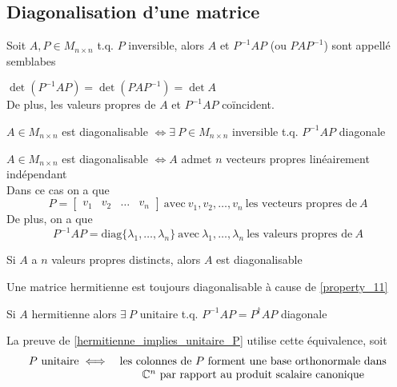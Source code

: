 \subsection{Diagonalisation d'une matrice}
\begin{definition}
    Soit $A, P \in M_{n \times n}$ t.q. $P$ inversible, alors $A$ et $P^{-1}AP$ (ou $PAP^{-1}$) sont appellé semblabes
\end{definition}
\begin{remark}
    $\det(P^{-1}AP) = \det(PAP^{-1}) = \det A$ \\
    De plus, les valeurs propres de $A$ et $P^{-1}AP$ coïncident.
\end{remark}
\begin{definition}
    $A \in M_{n \times n}$ est diagonalisable $\iff \exists \ P \in M_{n \times n}$ inversible t.q. $P^{-1}AP$ diagonale
\end{definition}
\begin{theorem}
    $A \in M_{n \times n}$ est diagonalisable $\iff A$ admet $n$ vecteurs propres linéairement indépendant \\
    Dans ce cas on a que \[P = \begin{bmatrix}
            v_1 & v_2 & \dots & v_n
        \end{bmatrix} \ \text{avec} \ v_1, v_2, \dots, v_n \ \text{les vecteurs propres de} \ A\] 
        De plus, on a que
        \[P^{-1}AP = \text{diag}\{\lambda_1, \dots, \lambda_n\} \ \text{avec} \ \lambda_1, \dots, \lambda_n 
        \ \text{les valeurs propres de} \ A\] 
\end{theorem}
\begin{corollary}
    Si $A$ a $n$ valeurs propres distincts, alors $A$ est diagonalisable
\end{corollary}
\begin{corollary}
    Une matrice hermitienne est toujours diagonalisable à cause de \ref{property_11}
\end{corollary}
\begin{corollary}
    \label{hermitienne_implies_unitaire_P}
    Si $A$ hermitienne alors $\exists \ P$ unitaire t.q. $P^{-1}AP = P^\dagger A P$ diagonale
\end{corollary}
\begin{remark}
    La preuve de \ref{hermitienne_implies_unitaire_P} utilise cette équivalence, soit
    \[
        \begin{matrix}
            P \ \text{unitaire} \iff & \text{les colonnes de} \ P \ \text{forment une base orthonormale dans} \\
                                     & \C^n \ \text{par rapport au produit scalaire canonique}
        \end{matrix}
    \]
\end{remark}


